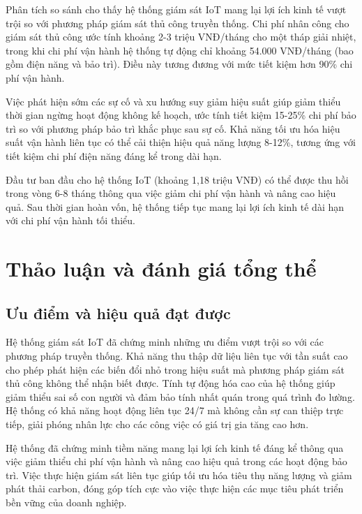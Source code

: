 \documentclass[../main.tex]{subfiles}
\begin{document}
Phân tích so sánh cho thấy hệ thống giám sát IoT mang lại lợi ích kinh tế vượt trội so với phương pháp giám sát thủ công truyền thống. Chi phí nhân công cho giám sát thủ công ước tính khoảng 2-3 triệu VNĐ/tháng cho một tháp giải nhiệt, trong khi chi phí vận hành hệ thống tự động chỉ khoảng 54.000 VNĐ/tháng (bao gồm điện năng và bảo trì). Điều này tương đương với mức tiết kiệm hơn 90\% chi phí vận hành.

Việc phát hiện sớm các sự cố và xu hướng suy giảm hiệu suất giúp giảm thiểu thời gian ngừng hoạt động không kế hoạch, ước tính tiết kiệm 15-25\% chi phí bảo trì so với phương pháp bảo trì khắc phục sau sự cố. Khả năng tối ưu hóa hiệu suất vận hành liên tục có thể cải thiện hiệu quả năng lượng 8-12\%, tương ứng với tiết kiệm chi phí điện năng đáng kể trong dài hạn.

Đầu tư ban đầu cho hệ thống IoT (khoảng 1,18 triệu VNĐ) có thể được thu hồi trong vòng 6-8 tháng thông qua việc giảm chi phí vận hành và nâng cao hiệu quả. Sau thời gian hoàn vốn, hệ thống tiếp tục mang lại lợi ích kinh tế dài hạn với chi phí vận hành tối thiểu.

\section{Thảo luận và đánh giá tổng thể}
\label{sec:discussion_overall_evaluation}

\subsection{Ưu điểm và hiệu quả đạt được}
\label{sec:system_advantages}

Hệ thống giám sát IoT đã chứng minh những ưu điểm vượt trội so với các phương pháp truyền thống. Khả năng thu thập dữ liệu liên tục với tần suất cao cho phép phát hiện các biến đổi nhỏ trong hiệu suất mà phương pháp giám sát thủ công không thể nhận biết được. Tính tự động hóa cao của hệ thống giúp giảm thiểu sai số con người và đảm bảo tính nhất quán trong quá trình đo lường. Hệ thống có khả năng hoạt động liên tục 24/7 mà không cần sự can thiệp trực tiếp, giải phóng nhân lực cho các công việc có giá trị gia tăng cao hơn.

Hệ thống đã chứng minh tiềm năng mang lại lợi ích kinh tế đáng kể thông qua việc giảm thiểu chi phí vận hành và nâng cao hiệu quả trong các hoạt động bảo trì. Việc thực hiện giám sát liên tục giúp tối ưu hóa tiêu thụ năng lượng và giảm phát thải carbon, đóng góp tích cực vào việc thực hiện các mục tiêu phát triển bền vững của doanh nghiệp.
\end{document}
